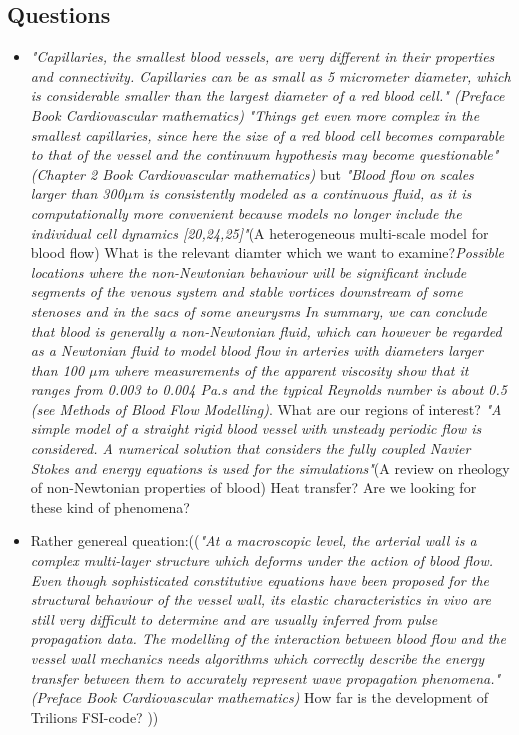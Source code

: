 \documentclass[11pt,letterpaper]{article}
\begin{document}
\newpage
\subsection*{Questions}
\begin{itemize}
    \item  \textit{"Capillaries, the smallest blood vessels, are very different in their properties and connectivity. Capillaries can be as small as 5 micrometer diameter, which is considerable smaller than the largest diameter of a red blood cell." (Preface Book Cardiovascular mathematics)} \newline
    \textit{"Things get even more complex in the smallest capillaries, since here the size of a red blood cell becomes comparable to that of the vessel and the continuum hypothesis may become questionable" (Chapter 2 Book Cardiovascular mathematics)}\newline
    but \textit{"Blood flow on scales larger than 300$\mu$m is consistently modeled as a continuous fluid, as it is computationally more convenient because models no longer include the individual cell dynamics [20,24,25]"}(A heterogeneous multi-scale model for blood flow)
\newline
{\color{red}What is the relevant diamter which we want to examine?}\newline \textit{Possible locations where the non-Newtonian behaviour will be significant include segments of the venous system and stable vortices downstream of some stenoses and in the sacs of some aneurysms} \textit{In summary, we can conclude that blood is generally a non-Newtonian fluid, which can however be
regarded as a Newtonian fluid to model blood flow in arteries with diameters larger than 100 $\mu$m where measurements of the apparent viscosity show that it ranges from 0.003 to 0.004 Pa.s and the typical Reynolds number is about 0.5 (see Methods of Blood Flow Modelling)}.\newline
{\color{red} What are our regions of interest?} \newline \textit{"A simple model of a straight rigid blood vessel with unsteady periodic flow is considered. A numerical solution that considers the fully coupled Navier Stokes and energy equations is used for the simulations"}(A review on rheology of non-Newtonian properties of blood) \newline
{\color{red}Heat transfer?}
{\color{red} Are we looking for these kind of phenomena?}
    \item Rather genereal queation:((\textit{"At a macroscopic level, the arterial wall is a complex multi-layer structure which deforms under the action of blood flow. Even though sophisticated constitutive equations have been proposed for the structural behaviour of the vessel wall, its elastic characteristics in vivo are still very difficult to determine and are usually inferred from pulse propagation data. The modelling of the interaction between blood flow and the vessel wall mechanics needs algorithms which correctly describe the energy transfer between them to accurately represent wave propagation phenomena." (Preface Book Cardiovascular mathematics)} \newline
    {\color{red}How far is the development of Trilions FSI-code?} ))
\end{itemize}
\end{document}
